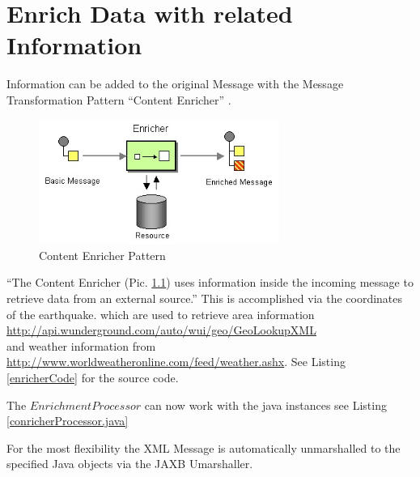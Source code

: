 \documentclass[11pt,english,ngerman, headsepline]{scrreprt}
\begin{document}



\chapter{Enrich Data with related Information}
Information can be
added to the original Message with the Message Transformation Pattern ``Content
Enricher'' .

  \begin{figure}[h!]
	\begin{center}
	\includegraphics[width=0.7\textwidth]{pics/DataEnricher.jpg}
	\end{center}
	\caption{Content Enricher Pattern \cite{hohpe2003enterprise}}
	\label{contentEnricherPic} 
   \end{figure}

``The Content Enricher (Pic. \ref{contentEnricherPic}) uses information inside
the incoming message to retrieve data from an external
source.\cite{hohpe2003enterprise}''
This is accomplished via the coordinates of the earthquake. which are used to
retrieve area information \\
\url{http://api.wunderground.com/auto/wui/geo/GeoLookupXML} \\and weather
information from \url{http://www.worldweatheronline.com/feed/weather.ashx}.
See Listing \ref{enricherCode} for the source code.



The $EnrichmentProcessor$ can now work with the java instances see Listing
\ref{conricherProcessor.java}







For the most flexibility the XML Message is automatically unmarshalled to the
specified Java objects via the JAXB Umarshaller. 
\end{document}

